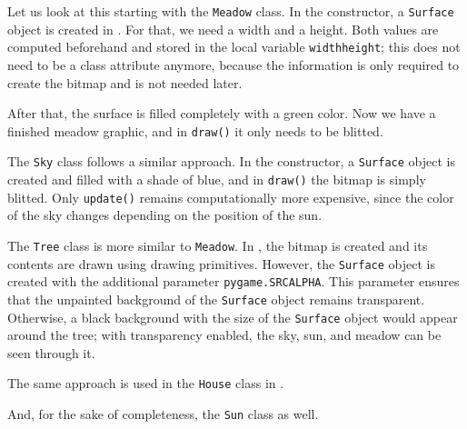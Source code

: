 Let us look at this starting with the \texttt{Meadow} class. In the constructor, a \texttt{Surface} object is created in . For that, we need a width and a height. Both values are computed beforehand and stored in the local variable \texttt{widthheight}; this does not need to be a class attribute anymore, because the information is only required to create the bitmap and is not needed later. 

After that, the surface is filled completely with a green color. Now we have a finished meadow graphic, and in \texttt{draw()} it only needs to be blitted.

\newpage
{}

The \texttt{Sky} class follows a similar approach. In the constructor, a \texttt{Surface} object is created and filled with a shade of blue, and in \texttt{draw()} the bitmap is simply blitted. Only \texttt{update()} remains computationally more expensive, since the color of the sky changes depending on the position of the sun.


The \texttt{Tree} class is more similar to \texttt{Meadow}. In , the bitmap is created and its contents are drawn using drawing primitives. However, the \texttt{Surface} object is created with the additional parameter \texttt{pygame.SRCALPHA}. This parameter ensures that the unpainted background of the \texttt{Surface} object remains transparent. Otherwise, a black background with the size of the \texttt{Surface} object would appear around the tree; with transparency enabled, the sky, sun, and meadow can be seen through it.


The same approach is used in the \texttt{House} class in .



And, for the sake of completeness, the \texttt{Sun} class as well.

